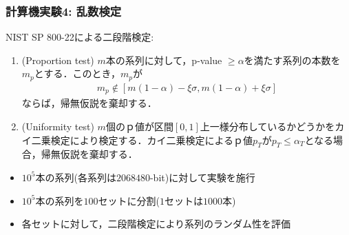\documentclass[dvipdfmx,11pt]{beamer}
\begin{document}
\begin{frame}[c]\frametitle{計算機実験4: 乱数検定}
NIST SP 800-22による二段階検定:
\begin{enumerate}
  \item (Proportion test) $m$本の系列に対して，p-value $\geq \alpha$を満たす系列の本数を$m_p$とする．このとき，$m_p$が
  \begin{align*}
    m_p \notin [m(1-\alpha)-\xi\sigma, m(1-\alpha)+\xi\sigma]
  \end{align*}
  ならば，帰無仮説を棄却する．
  \item (Uniformity test) $m$個のｐ値が区間$[0,1]$上一様分布しているかどうかをカイ二乗検定により検定する．カイ二乗検定によるｐ値$p_T$が$p_T \leq \alpha_T$となる場合，帰無仮説を棄却する．  
\end{enumerate}
%
\begin{itemize}
  \item $10^5$本の系列(各系列は$2068480$-bit)に対して実験を施行
  \item $10^5$本の系列を$100$セットに分割($1$セットは$1000$本)
  \item 各セットに対して，二段階検定により系列のランダム性を評価
\end{itemize}
\end{frame}
\end{document}
